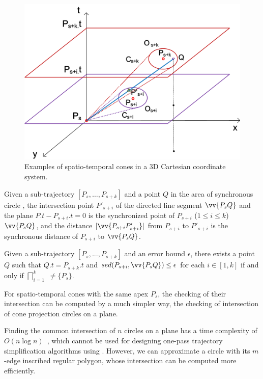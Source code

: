 \begin{figure}[tb!]
	\centering
	\includegraphics[scale=0.66]{figures/Fig-CIS.png}
	\caption{\small Examples of spatio-temporal cones in a 3D Cartesian coordinate system.}
	\label{fig:cis}
\end{figure}


	Given a sub-trajectory $[P_s, \ldots, P_{s+k}]$ and a point $Q$ in the area of synchronous circle , the intersection point $P'_{s+i}$ of the directed line segment $\vv{P_sQ}$ and the plane $P.t - P_{s+i}.t = 0$ is the synchronized point of $P_{s+i}$ ($1\le i\le k$) \wrt  $\vv{P_sQ}$, and the distance $|\vv{P_{s+i}P'_{s+i}}|$ from $P_{s+i}$ to $P'_{s+i}$ is the synchronous distance of $P_{s+i}$ to $\vv{P_sQ}$.

	Given a sub-trajectory $[P_s,...,P_{s+k}]$ and an error bound $\epsilon$, there exists a point $Q$ such that $Q.t = P_{s+k}.t$ and $sed(P_{s+i}, \vv{P_sQ})\le \epsilon$ for each $i \in [1,k]$ if and only if $\bigsqcap_{i=1}^{k}$ $\ne \{P_s\}$.


For spatio-temporal cones with the same apex $P_s$, the checking of their intersection can be computed by a much simpler way, \ie the checking of intersection of cone projection circles on a plane.


Finding the common intersection of $n$ circles on a plane has a time complexity of ${O(n\log n)}$~\cite{Shamos:Circle}, which cannot be used for designing one-pass trajectory simplification algorithms using \sed.
%
However, we can approximate a circle with its $m$-edge inscribed regular polygon, whose intersection can be computed more efficiently.

